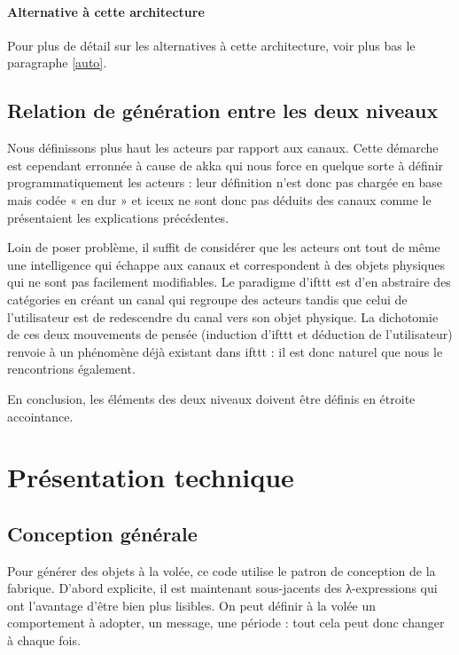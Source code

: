 \documentclass[11pt]{article}
\begin{document}
\paragraph{Alternative à cette architecture} Pour plus de détail sur les alternatives à cette architecture, voir plus bas le paragraphe \ref{auto}.

\subsection{Relation de génération entre les deux niveaux}

Nous définissons plus haut les acteurs par rapport aux canaux. Cette démarche est cependant erronnée à cause de akka qui nous force en quelque sorte à définir programmatiquement les acteurs : leur définition n'est donc pas chargée en base mais codée « en dur » et iceux ne sont donc pas déduits des canaux comme le présentaient les explications précédentes.

Loin de poser problème, il suffit de considérer que les acteurs ont tout de même une intelligence qui échappe aux canaux et correspondent à des objets physiques qui ne sont pas facilement modifiables. Le paradigme d'ifttt est d'en abstraire des catégories en créant un canal qui regroupe des acteurs tandis que celui de l'utilisateur est de redescendre du canal vers son objet physique. La dichotomie de ces deux mouvements de pensée (induction d'ifttt et déduction de l'utilisateur) renvoie à un phénomène déjà existant dans ifttt : il est donc naturel que nous le rencontrions également.

En conclusion, les éléments des deux niveaux doivent être définis en étroite accointance.

\section{Présentation technique}

\subsection{Conception générale}

Pour générer des objets à la volée, ce code utilise le patron de conception de la fabrique. D'abord explicite, il est maintenant sous-jacents des λ-expressions qui ont l'avantage d'être bien plus lisibles. On peut définir à la volée un comportement à adopter, un message, une période : tout cela peut donc changer à chaque fois. 
\end{document}
